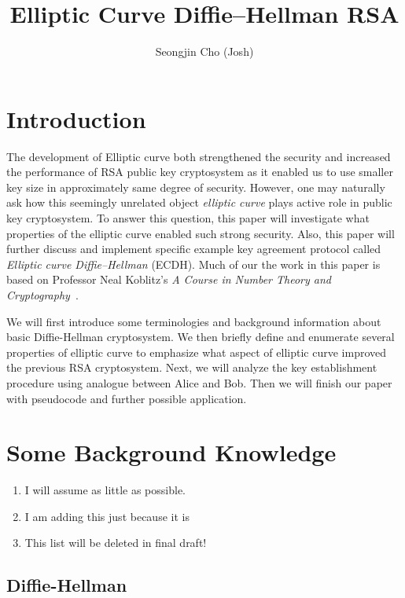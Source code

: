 \documentclass[11pt]{article}
\begin{document}
\title{Elliptic Curve Diffie–Hellman RSA}
\author{Seongjin Cho (Josh)}
\maketitle

\tableofcontents

\newpage

\section{Introduction}
The development of Elliptic curve both strengthened the security and increased the performance of RSA public key cryptosystem as it enabled us to use smaller key size in approximately same degree of security. However, one may naturally ask how this seemingly unrelated object \emph{elliptic curve} plays active role in public key cryptosystem. To answer this question, this paper will investigate what properties of the elliptic curve enabled such strong security. Also, this paper will further discuss and implement specific example key agreement protocol called \emph{Elliptic curve Diffie–Hellman} (ECDH). Much of our the work in this paper is based on Professor Neal Koblitz's  \emph{A Course in Number Theory and Cryptography}~\cite{Neal2}.

We will first introduce some terminologies and background information about basic Diffie-Hellman cryptosystem. We then briefly define and enumerate several properties of elliptic curve to emphasize what aspect of elliptic curve improved the previous RSA cryptosystem. Next, we will analyze the key establishment procedure using analogue between Alice and Bob. Then we will finish our paper with pseudocode and further possible application.


\section{Some Background Knowledge}
\begin{enumerate}
\item I will assume as little as possible.
\item I am adding this just because it is
\item This list will be deleted in final draft!
\end{enumerate}

\subsection{Diffie-Hellman}
\end{document}
